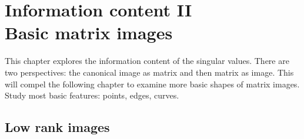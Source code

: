 \chapter{Information content II\\Basic matrix images}

This chapter explores the information content of the singular values. There are two perspectives: the canonical image as matrix and then matrix as image. This will compel the following chapter to examine more basic shapes of matrix images. Study most basic features: points, edges, curves.


%
%
\clearpage
\section{Low rank images}



%

%
%
%
%
%
%
%
%
%
%
%
%
%
%
